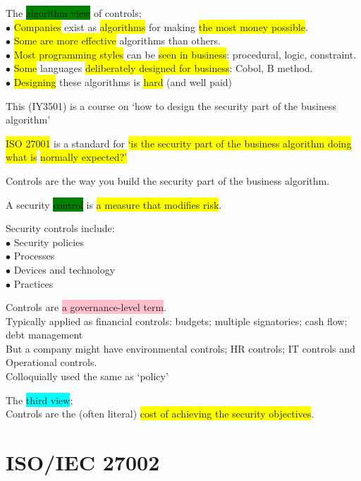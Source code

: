 \documentclass[tikz,border=10pt]{project_plan}
\newcommand{\bulletPoint}{\hspace{-3.1pt}$\bullet$ \hspace{5pt}}
\begin{document}
The \colorbox{green}{algorithm view} of controls;\\
\bulletPoint \colorbox{yellow}{Companies} exist as \colorbox{yellow}{algorithms} for making \colorbox{yellow}{the most money possible}. \\
\bulletPoint \colorbox{yellow}{Some are more effective} algorithms than others. \\
\bulletPoint \colorbox{yellow}{Most programming styles} can be \colorbox{yellow}{seen in business}:  procedural, logic, constraint. \\
\bulletPoint \colorbox{yellow}{Some} languages \colorbox{yellow}{deliberately designed for business}: Cobol, B method.\\
\bulletPoint \colorbox{yellow}{Designing} these algorithms is \colorbox{yellow}{hard} (and well paid)

This (IY3501) is a course on ‘how to design the security part of  the business algorithm’

\colorbox{yellow}{ISO 27001} is a standard for \colorbox{yellow}{‘is the security part of the business algorithm doing what is} \colorbox{yellow}{normally expected?’}

Controls are the way you build the security part of the business algorithm.

A security \colorbox{green}{control} is \colorbox{yellow}{a measure that modifies risk}.

Security controls include:\\
\bulletPoint Security policies\\
\bulletPoint Processes\\
\bulletPoint Devices and technology\\
\bulletPoint Practices

Controls are \colorbox{pink}{a governance-level term}. \\
Typically applied as financial controls: budgets; multiple signatories; cash flow; debt management \\
But a company might have environmental controls; HR controls; IT controls and Operational controls.\\
Colloquially used the same as ‘policy’

The \colorbox{cyan}{third view};\\
Controls are the (often literal) \colorbox{yellow}{cost of achieving the security objectives}.

\section{ISO/IEC 27002}
\end{document}
